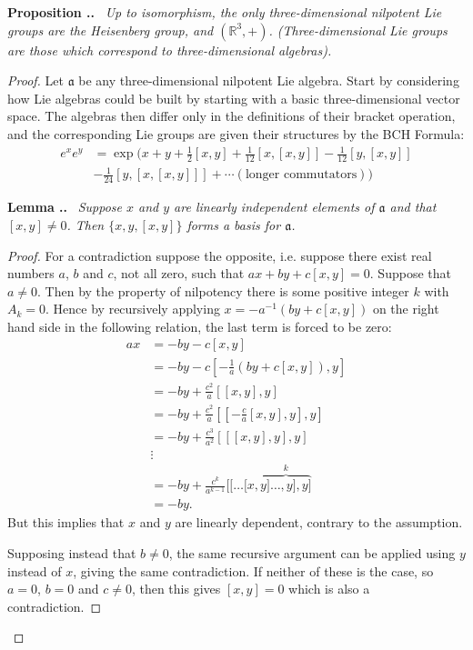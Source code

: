\documentclass[honours]{UNSWthesis}
\newcommand{\R}{\mathbb{R}}
\newcommand{\1}{\mathbf{e}_{1}}
\newcommand{\2}{\mathbf{e}_{3}}
\newcommand{\3}{\mathbf{e}_{3}}
\newcounter{Item}[section]
\newenvironment{Proposition}{\medskip
                            \refstepcounter{Item}
                            \noindent
                           {\bf Proposition \thesection.\theItem.}\ %
                            \begingroup \sl}
                           {\endgroup\medskip}
\newenvironment{Lemma}{\medskip
                            \refstepcounter{Item}
                            \noindent
                           {\bf Lemma \thesection.\theItem.}\ %
                            \begingroup \sl}
                           {\endgroup\medskip}
\begin{document}
\begin{Proposition}
Up to isomorphism, the only three-dimensional nilpotent Lie groups are the Heisenberg group, and $(\R^{3},+)$. (Three-dimensional Lie groups are those which correspond to three-dimensional algebras).
\end{Proposition}

\begin{proof}
Let $\mathfrak{a}$ be any three-dimensional nilpotent Lie algebra.
Start by considering how Lie algebras could be built by starting with a basic three-dimensional vector space. The algebras then differ only in the definitions of their bracket operation, and the corresponding Lie groups are given their structures by the BCH Formula:
\begin{align*}
e^{x}e^{y} &= \exp\big( x+y+\frac{1}{2}[x,y]+\frac{1}{12}[x,[x,y]]-\frac{1}{12}[y,[x,y]] \\
&-\frac{1}{24}[y,[x,[x,y]]]+\cdots (\text{longer commutators}) \big)
\end{align*}


\begin{Lemma}
Suppose $x$ and $y$ are linearly independent elements of $\mathfrak{a}$ and that $[x,y] \neq 0$. Then $\{x,y,[x,y]\}$ forms a basis for $\mathfrak{a}$.
\begin{proof}
For a contradiction suppose the opposite, i.e. suppose there exist real numbers $a$, $b$ and $c$, not all zero, such that $ax+by+c[x,y]=0$. Suppose that $a \neq 0$. Then by the property of nilpotency there is some positive integer $k$ with $A_{k}=0$. Hence by recursively applying $x=-a^{-1}(by+c[x,y])$ on the right hand side in the following relation, the last term is forced to be zero:
\begin{align*}
ax &= -by-c[x,y]\\
&=-by-c[-\frac{1}{a}(by+c[x,y]),y] \\
&= -by+\frac{c^{2}}{a}[[x,y],y] \\
&= -by+\frac{c^{2}}{a}[[-\frac{c}{a}[x,y],y],y] \\
&= -by+\frac{c^{3}}{a^{2}}[[[x,y],y],y] \\
& \vdots \\
&= -by+\frac{c^{k}}{a^{k-1}}[[\ldots[x,\overbrace{y]\ldots ,y],y]}^{k} \\
&= -by.
\end{align*}
But this implies that $x$ and $y$ are linearly dependent, contrary to the assumption.

Supposing instead that $b \neq 0$, the same recursive argument can be applied using $y$ instead of $x$, giving the same contradiction. \newline
If neither of these is the case, so $a=0$, $b=0$ and $c \neq 0$, then this gives $[x,y]=0$ which is also a contradiction.


\end{proof}
\end{Lemma}
\end{proof}
\end{document}
